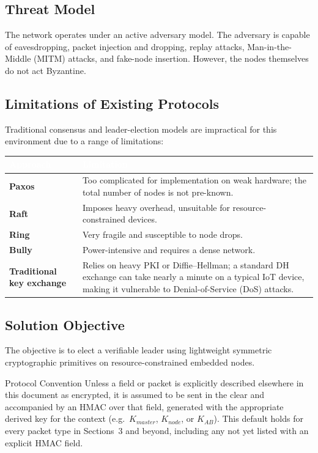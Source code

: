 \documentclass[11pt,a4paper]{article}
\newcommand{\citeref}[1]{}
\begin{document}
\subsection{Threat Model}

The network operates under an active adversary model.\citeref{1} The adversary is capable of eavesdropping, packet injection and dropping, replay attacks, Man-in-the-Middle (MITM) attacks, and fake-node insertion.\citeref{1} However, the nodes themselves do not act Byzantine.\citeref{1}

\subsection{Limitations of Existing Protocols}

Traditional consensus and leader-election models are impractical for this environment due to a range of limitations:\citeref{1}

\begin{longtable}{@{}>{\bfseries}p{3.2cm}p{11cm}@{}}
\toprule
\rowcolor{havennavy}
\textcolor{white}{Approach} & \textcolor{white}{Limitation} \\
\midrule
\endhead
Paxos & Too complicated for implementation on weak hardware; the total number of nodes is not pre-known. \\
Raft & Imposes heavy overhead, unsuitable for resource-constrained devices. \\
Ring & Very fragile and susceptible to node drops. \\
Bully & Power-intensive and requires a dense network. \\
Traditional key exchange & Relies on heavy PKI or Diffie--Hellman; a standard DH exchange can take nearly a minute on a typical IoT device, making it vulnerable to Denial-of-Service (DoS) attacks. \\
\bottomrule
\end{longtable}

\subsection{Solution Objective}

The objective is to elect a verifiable leader using lightweight symmetric cryptographic primitives on resource-constrained embedded nodes.\citeref{1}

\begin{notebox}{Protocol Convention}
Unless a field or packet is explicitly described elsewhere in this document as encrypted, it is assumed to be sent in the clear and accompanied by an HMAC over that field, generated with the appropriate derived key for the context (e.g.\ $K_{master}$, $K_{node}$, or $K_{AB}$). This default holds for every packet type in Sections~3 and beyond, including any not yet listed with an explicit HMAC field.
\end{notebox}
\end{document}
